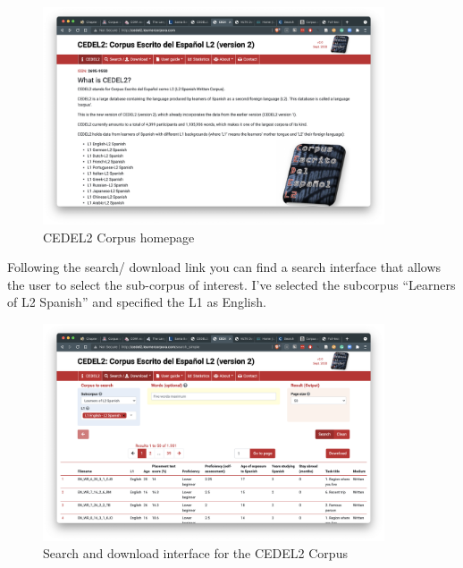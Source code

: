 \documentclass[
  letterpaper,
]{latex/krantz}
\begin{document}
\begin{figure}

{\centering \includegraphics[width=0.9\textwidth,height=\textheight]{./figures/acquire-data/ad-cedel2-site.png}

}

\caption{\label{fig-ad-show-page-cedel2-1}CEDEL2 Corpus homepage}

\end{figure}

Following the search/ download link you can find a search interface that
allows the user to select the sub-corpus of interest. I've selected the
subcorpus ``Learners of L2 Spanish'' and specified the L1 as English.

\begin{figure}

{\centering \includegraphics[width=0.9\textwidth,height=\textheight]{./figures/acquire-data/ad-cedel2-search-download.png}

}

\caption{\label{fig-ad-show-page-cedel2-2}Search and download interface
for the CEDEL2 Corpus}

\end{figure}
\end{document}
